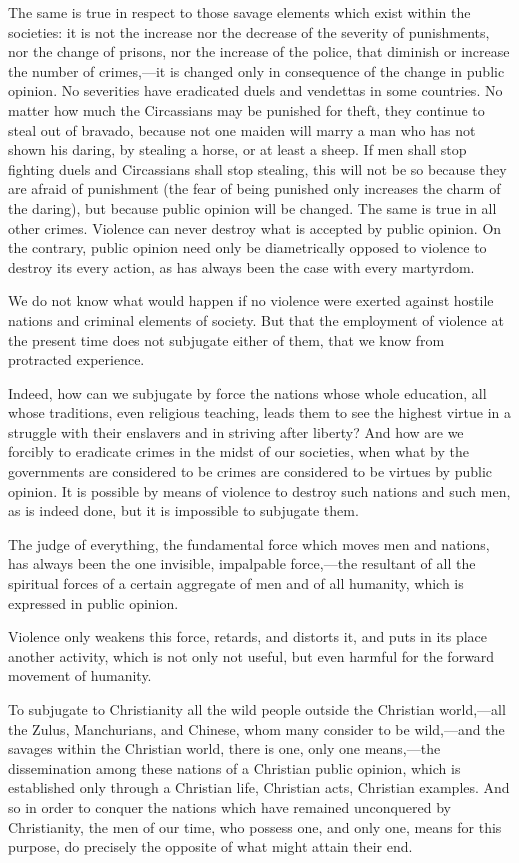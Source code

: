 \documentclass{book}
\begin{document}
The same is true in respect to those savage elements which exist within the societies: it is not the increase nor the decrease of the severity of punishments, nor the change of prisons, nor the increase of the police, that diminish or increase the number of crimes,—it is changed only in consequence of the change in public opinion. No severities have eradicated duels and vendettas in some countries. No matter how much the Circassians may be punished for theft, they continue to steal out of bravado, because not one maiden will marry a man who has not shown his daring, by stealing a horse, or at least a sheep. If men shall stop fighting duels and Circassians shall stop stealing, this will not be so because they are afraid of punishment (the fear of being punished only increases the charm of the daring), but because public opinion will be changed. The same is true in all other crimes. Violence can never destroy what is accepted by public opinion. On the contrary, public opinion need only be diametrically opposed to violence to destroy its every action, as has always been the case with every martyrdom.

We do not know what would happen if no violence were exerted against hostile nations and criminal elements of society. But that the employment of violence at the present time does not subjugate either of them, that we know from protracted experience.

Indeed, how can we subjugate by force the nations whose whole education, all whose traditions, even religious teaching, leads them to see the highest virtue in a struggle with their enslavers and in striving after liberty? And how are we forcibly to eradicate crimes in the midst of our societies, when what by the governments are considered to be crimes are considered to be virtues by public opinion. It is possible by means of violence to destroy such nations and such men, as is indeed done, but it is impossible to subjugate them.

The judge of everything, the fundamental force which moves men and nations, has always been the one invisible, impalpable force,—the resultant of all the spiritual forces of a certain aggregate of men and of all humanity, which is expressed in public opinion.

Violence only weakens this force, retards, and distorts it, and puts in its place another activity, which is not only not useful, but even harmful for the forward movement of humanity.

To subjugate to Christianity all the wild people outside the Christian world,—all the Zulus, Manchurians, and Chinese, whom many consider to be wild,—and the savages within the Christian world, there is one, only one means,—the dissemination among these nations of a Christian public opinion, which is established only through a Christian life, Christian acts, Christian examples. And so in order to conquer the nations which have remained unconquered by Christianity, the men of our time, who possess one, and only one, means for this purpose, do precisely the opposite of what might attain their end.
\end{document}
